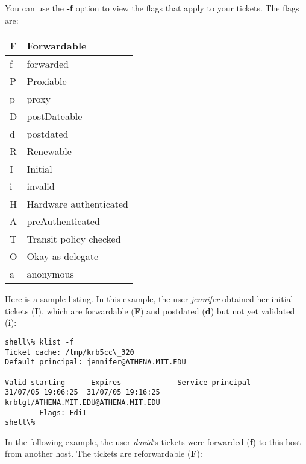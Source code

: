 \documentclass[letterpaper,10pt,english]{sphinxmanual}
\begin{document}
You can use the \textbf{-f} option to view the flags that apply to your
tickets.  The flags are:

\begin{tabulary}{\linewidth}{|L|L|}
\hline

F
 & 
Forwardable
\\\hline

f
 & 
forwarded
\\\hline

P
 & 
Proxiable
\\\hline

p
 & 
proxy
\\\hline

D
 & 
postDateable
\\\hline

d
 & 
postdated
\\\hline

R
 & 
Renewable
\\\hline

I
 & 
Initial
\\\hline

i
 & 
invalid
\\\hline

H
 & 
Hardware authenticated
\\\hline

A
 & 
preAuthenticated
\\\hline

T
 & 
Transit policy checked
\\\hline

O
 & 
Okay as delegate
\\\hline

a
 & 
anonymous
\\\hline
\end{tabulary}


Here is a sample listing.  In this example, the user \emph{jennifer}
obtained her initial tickets (\textbf{I}), which are forwardable (\textbf{F})
and postdated (\textbf{d}) but not yet validated (\textbf{i}):

\begin{Verbatim}[commandchars=\\\{\}]
shell\% klist -f
Ticket cache: /tmp/krb5cc\_320
Default principal: jennifer@ATHENA.MIT.EDU

Valid starting      Expires             Service principal
31/07/05 19:06:25  31/07/05 19:16:25  krbtgt/ATHENA.MIT.EDU@ATHENA.MIT.EDU
        Flags: FdiI
shell\%
\end{Verbatim}

In the following example, the user \emph{david}`s tickets were forwarded
(\textbf{f}) to this host from another host.  The tickets are reforwardable
(\textbf{F}):
\end{document}
